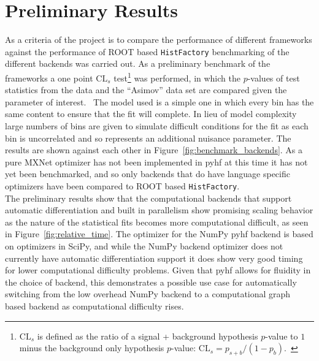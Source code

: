 \section{Preliminary Results}\label{section:results}

As a criteria of the project is to compare the performance of different frameworks against the performance of ROOT based \texttt{HistFactory} benchmarking of the different backends was carried out.
As a preliminary benchmark of the frameworks a one point $\text{CL}_{s}$ test\footnote{$\text{CL}_{s}$ is defined as the ratio of a signal + background hypothesis $p$-value to $1$ minus the background only hypothesis $p$-value: $\text{CL}_{s} = p_{s+b}/\left(1-p_{b}\right)$.~\cite{Cowan:2010js}} was performed, in which the $p$-values of test statistics from the data and the ``Asimov'' data set are compared given the parameter of interest.~\cite{Cowan:2010js}
The model used is a simple one in which every bin has the same content to ensure that the fit will complete.
In lieu of model complexity large numbers of bins are given to simulate difficult conditions for the fit as each bin is uncorrelated and so represents an additional nuisance parameter.
The results are shown against each other in Figure~\ref{fig:benchmark_backends}.
As a pure MXNet optimizer has not been implemented in pyhf at this time it has not yet been benchmarked, and so only backends that do have language specific optimizers have been compared to ROOT based \texttt{HistFactory}.\\

The preliminary results show that the computational backends that support automatic differentiation and built in parallelism show promising scaling behavior as the nature of the statistical fits becomes more computational difficult, as seen in Figure~\ref{fig:relative_time}.
The optimizer for the NumPy pyhf backend is based on optimizers in SciPy, and while the NumPy backend optimizer does not currently have automatic differentiation support it does show very good timing for lower computational difficulty problems.
Given that pyhf allows for fluidity in the choice of backend, this demonstrates a possible use case for automatically switching from the low overhead NumPy backend to a computational graph based backend as computational difficulty rises.

